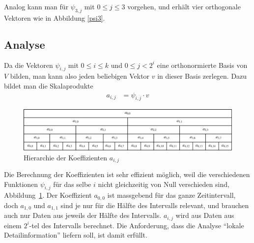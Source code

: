 Analog kann man für $\psi_{3,j}$ mit $0\le j\le 3$ vorgehen, und
erhält vier orthogonale Vektoren wie in Abbildung \ref{psi3}.

\subsection{Analyse}
Da die Vektoren $\psi_{i,j}$ mit $0\le i\le k$ und
$0\le j< 2^i$ eine orthonormierte Basis von $V$ bilden, man kann also
jeden beliebigen Vektor $v$ in dieser Basis zerlegen.
Dazu bildet man die Skalaprodukte
\begin{align*}
a_{i,j}&=\psi_{i,j}\cdot v
\end{align*}
\begin{figure}
\begin{center}
\includegraphics[width=\hsize]{images/signal-4}
\end{center}
\caption{Hierarchie der Koeffizienten $a_{i,j}$\label{coefhierarchy}}
\end{figure}
Die Berechnung der Koeffizienten ist sehr effizient möglich, weil die
verschiedenen Funktionen $\psi_{i,j}$ für das selbe $i$ nicht gleichzeitig
von Null verschieden sind, Abbildung~\ref{coefhierarchy}.
Der Koeffizient $a_{0,0}$ ist massgebend für das ganze Zeitintervall,
doch $a_{1,0}$ und $a_{1,1}$ sind je nur für die Hälfte des Intervalls
relevant, und brauchen auch nur Daten aus jeweils der Hälfte
des Intervalls. $a_{i,j}$ wird aus Daten aus einem $2^i$-tel des
Intervalls berechnet.
Die Anforderung, dass die Analyse ``lokale Detailinformation''
liefern soll, ist damit erfüllt.

